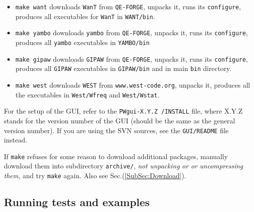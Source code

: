 \documentclass[12pt,a4paper]{article}
\def\configure{\texttt{configure}}
\begin{document}
\begin{itemize}
\item \texttt{make want} downloads \texttt{WanT} from \texttt{QE-FORGE},
			 unpacks it, runs its \configure,
                         produces all executables for \texttt{WanT} in
                         \texttt{WANT/bin}.
\item \texttt{make yambo} downloads \texttt{yambo} from \texttt{QE-FORGE},
			  unpacks it, runs its \configure,
                          produces all \texttt{yambo} executables in
                          \texttt{YAMBO/bin}
\item \texttt{make gipaw} downloads \texttt{GIPAW} from \texttt{QE-FORGE},
                          unpacks it, runs its \configure,
                          produces all \texttt{GIPAW} executables in
                          \texttt{GIPAW/bin} and in main \texttt{bin} directory.
\item \texttt{make west} downloads \texttt{WEST} from \texttt{www.west-code.org},
                          unpacks it, produces all the executables
                          in \texttt{West/Wfreq} and \texttt{West/Wstat}.
\end{itemize}
For the setup of the GUI, refer to the \texttt{PWgui-X.Y.Z /INSTALL} file, where
X.Y.Z stands for the version number of the GUI (should be the same as the
general version number). If you are using the SVN sources, see
the \texttt{GUI/README} file instead.

If \texttt{make} refuses for some reason to download additional
packages, manually download them into subdirectory
\texttt{archive/}, {\em not unpacking or or uncompressing them},
and try \texttt{make} again. Also see Sec.(\ref{SubSec:Download}).

\subsection{Running tests and examples}
\label{SubSec:Examples}
\end{document}
